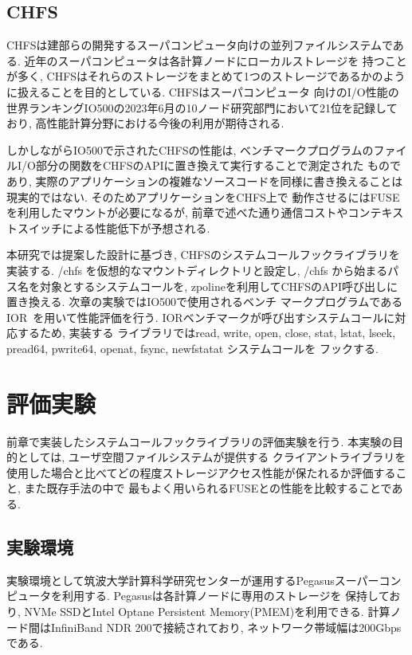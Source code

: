 \documentclass[a4paper,11pt]{jreport}
\begin{document}
\section{CHFS}
CHFSは建部らの開発するスーパコンピュータ向けの並列ファイルシステムである. 近年のスーパコンピュータは各計算ノードにローカルストレージを
持つことが多く, CHFSはそれらのストレージをまとめて1つのストレージであるかのように扱えることを目的としている. CHFSはスーパコンピュータ
向けのI/O性能の世界ランキングIO500の2023年6月の10ノード研究部門において21位を記録しており, 高性能計算分野における今後の利用が期待される.

しかしながらIO500で示されたCHFSの性能は, ベンチマークプログラムのファイルI/O部分の関数をCHFSのAPIに置き換えて実行することで測定された
ものであり, 実際のアプリケーションの複雑なソースコードを同様に書き換えることは現実的ではない. そのためアプリケーションをCHFS上で
動作させるにはFUSEを利用したマウントが必要になるが, 前章で述べた通り通信コストやコンテキストスイッチによる性能低下が予想される.

本研究では提案した設計に基づき, CHFSのシステムコールフックライブラリを実装する. /chfs を仮想的なマウントディレクトリと設定し, /chfs
から始まるパス名を対象とするシステムコールを, zpolineを利用してCHFSのAPI呼び出しに置き換える. 次章の実験ではIO500で使用されるベンチ
マークプログラムであるIOR~\cite{ior}を用いて性能評価を行う. IORベンチマークが呼び出すシステムコールに対応するため, 実装する
ライブラリではread, write, open, close, stat, lstat, lseek, pread64, pwrite64, openat, fsync, newfstatat システムコールを
フックする.

\chapter{評価実験}
前章で実装したシステムコールフックライブラリの評価実験を行う. 本実験の目的としては, ユーザ空間ファイルシステムが提供する
クライアントライブラリを使用した場合と比べてどの程度ストレージアクセス性能が保たれるか評価すること, また既存手法の中で
最もよく用いられるFUSEとの性能を比較することである. 

\section{実験環境}
実験環境として筑波大学計算科学研究センターが運用するPegasusスーパーコンピュータを利用する. Pegasusは各計算ノードに専用のストレージを
保持しており, NVMe SSDとIntel Optane Persistent Memory(PMEM)を利用できる.  計算ノード間はInfiniBand NDR 200で接続されており, 
ネットワーク帯域幅は200Gbpsである. 
\end{document}
